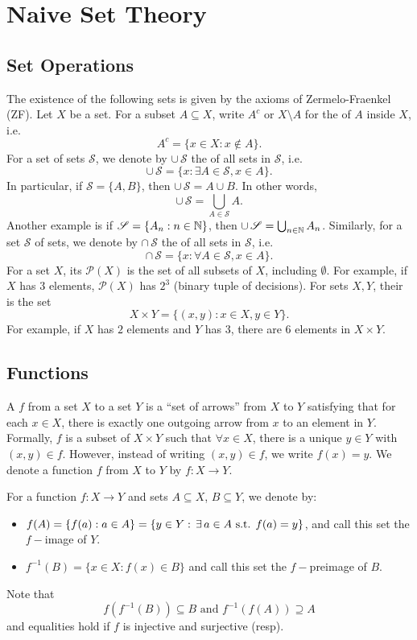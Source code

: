 \documentclass[14pt,oneside]{extarticle}
\begin{document}
\section{Naive Set Theory}
\subsection{Set Operations}
The existence of the following sets is given by the axioms of Zermelo-Fraenkel (ZF).
Let $X$ be a set. For a subset $A \subseteq X$, write $A^c$ or $X \setminus A$ for the  of $A$ inside $X$, i.e.
  \[A^c = \{x \in X: x \notin A\}.\]
For a set of sets $\mathscr{S}$, we denote by $\cup \, \mathscr{S}$ the  of all sets in $\mathscr{S}$, i.e. 
  \[\cup \, \mathscr{S} = \{x: \exists A \in \mathscr{S}, x \in A\}.\]
In particular, if $\mathscr{S} =  \{A,B\}$, then $\cup \, \mathscr{S} = A \cup B$. In other words,
\[\cup \, \mathscr{S} = \bigcup_{A \in \mathscr{S}} A.\]
Another example is if $\mathscr{S} = \{A_n: n \in \mathbb{N}\}$, then $\cup \, \mathscr{S} = \bigcup_{n \in \mathbb{N}} A_n$.
Similarly, for a set $\mathscr{S}$ of sets, we denote by $\cap \, \mathscr{S}$ the  of all sets in $\mathscr{S}$, i.e.
  \[\cap \, \mathscr{S} = \{x: \forall A \in \mathscr{S}, x \in A\}.\]
For a set $X$, its  $\mathscr{P}(X)$ is the set of all subsets of $X$, including $\emptyset$. For example, if $X$ has $3$ elements, $\mathscr{P}(X)$ has $2^3$ (binary tuple of decisions).
For sets $X,Y$, their  is the set 
\[X \times Y = \{(x,y): x \in X, y \in Y\}. \]
For example, if $X$ has $2$ elements and $Y$ has 3, there are $6$ elements in $X \times Y$.

\subsection{Functions}
\begin{definition*}
  A  $f$ from a set $X$ to a set $Y$ is a ``set of arrows'' from $X$ to $Y$ satisfying that for each $x \in X$, there is exactly one outgoing arrow from $x$ to an element in $Y$. Formally, $f$ is a subset of $X \times Y$ such that $\forall x \in X$, there is a unique $y \in Y$ with $(x,y) \in f$. However, instead of writing $(x,y) \in f$, we write $f(x) = y$. We denote a function $f$ from $X$ to $Y$ by $f:X \to Y$.
\end{definition*}

\pic

For a function $f:X \to Y$ and sets $A \subseteq X$, $B \subseteq Y$, we denote by:
\begin{itemize}[label=$\rightarrow$, nosep]
  \item $f(A) = \{f(a): a \in A\} = \{y \in Y: \exists a \in A \stt f(a) = y\}$, and call this set the $f-$image of $Y$.
  \item $f^{-1}(B)= \{x \in X: f(x) \in B\}$ and call this set the $f-$preimage of $B$.
\end{itemize}
Note that
\[f(f^{-1}(B)) \subseteq B \text{ and } f^{-1}(f(A)) \supseteq A\]
and equalities hold if $f$ is injective and surjective (resp).
\end{document}
